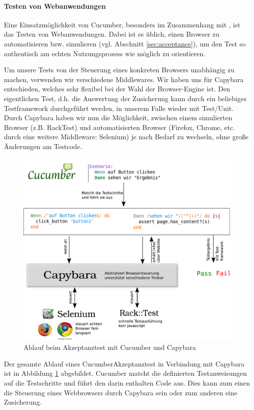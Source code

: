 \paragraph{Testen von Webanwendungen}
Eine Einsatzmöglichkeit von Cucumber, besonders im Zusammenhang mit , ist das Testen von Webanwendungen. Dabei ist es üblich, einen Browser zu automatisieren bzw. simulieren (vgl. Abschnitt \ref{sec:acceptance}), um den Test so authentisch am echten Nutzungsprozess wie möglich zu orientieren.

Um unsere Tests von der Steuerung eines konkreten Browsers unabhängig zu machen, verwenden wir verschiedene Middlewares. Wir haben uns für Capybara entschieden, welches sehr flexibel bei der Wahl der Browser-Engine ist. Den eigentlichen Test, d.h. die Auswertung der Zusicherung kann durch ein beliebiges Testframework durchgeführt werden, in unserem Falle wieder mit Test/Unit. Durch Capybara haben wir nun die Möglichkeit, zwischen einem simulierten Browser (z.B. RackTest) und automatisierten Browser (Firefox, Chrome, etc. durch eine weitere Middleware: Selenium) je nach Bedarf zu wechseln, ohne große Änderungen am Testcode.
\begin{figure}[htbp]
 \centering
 \includegraphics[width=\linewidth]{./diagrams/cucumber.pdf}
 \caption{Ablauf beim Akzeptanztest mit Cucumber und Capybara}
 \label{fig:cucumber}
\end{figure}

Der gesamte Ablauf eines CucumberAkzeptanztest in Verbindung mit Capybara ist in Abbildung \ref{fig:cucumber} abgebildet. Cucumber matcht die definierten Testanweisungen auf die Testschritte und führt den darin enthalten Code aus. Dies kann zum einen die Steuerung eines Webbrowsers durch Capybara sein oder zum anderen eine Zusicherung.
